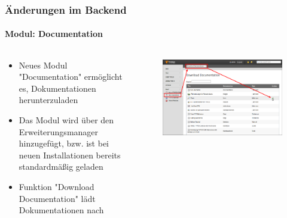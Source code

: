 \begin{frame}[fragile]
	\frametitle{Änderungen im Backend}
	\framesubtitle{Modul: Documentation}

	\begin{columns}[T]

		\begin{column}{.5\textwidth}
			\begin{itemize}
				\item Neues Modul "Documentation" ermöglicht es, Dokumentationen herunterzuladen
				\item Das Modul wird über den Erweiterungsmanager hinzugefügt, bzw. ist bei neuen Installationen bereits standardmäßig geladen
				\item Funktion "Download Documentation" lädt Dokumentationen nach
			\end{itemize}
		\end{column}

		\begin{column}{.5\textwidth}
			\begin{figure}\vspace*{-0.4cm}
				\includegraphics[width=1\linewidth]{Images/BackendChanges/DownloadDocumentation.png}
			\end{figure}
		\end{column}

	\end{columns}

\end{frame}


